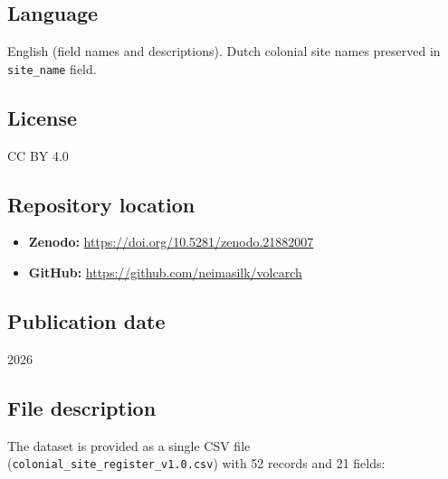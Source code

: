 \documentclass[11pt]{article}
\begin{document}
\subsection{Language}

English (field names and descriptions). Dutch colonial site names preserved in \texttt{site\_name} field.

\subsection{License}

CC BY 4.0

\subsection{Repository location}

\begin{itemize}
    \item \textbf{Zenodo:} \url{https://doi.org/10.5281/zenodo.21882007}
    \item \textbf{GitHub:} \url{https://github.com/neimasilk/volcarch}
\end{itemize}

\subsection{Publication date}

2026

\subsection{File description}

The dataset is provided as a single CSV file (\texttt{colonial\_site\_register\_v1.0.csv}) with 52 records and 21 fields:
\end{document}
